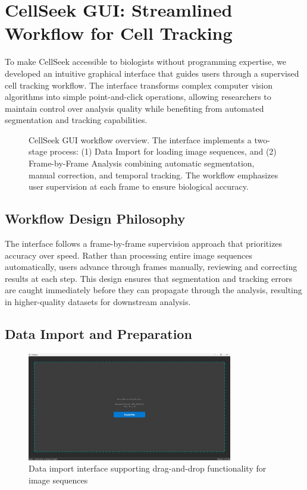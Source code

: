 \documentclass[../cellseek_paper.tex]{subfiles}
\begin{document}
\section{CellSeek GUI: Streamlined Workflow for Cell Tracking}

To make CellSeek accessible to biologists without programming expertise, we developed an intuitive graphical interface that guides users through a supervised cell tracking workflow. The interface transforms complex computer vision algorithms into simple point-and-click operations, allowing researchers to maintain control over analysis quality while benefiting from automated segmentation and tracking capabilities.

\begin{figure}[H]
  \centering
  
  \caption{CellSeek GUI workflow overview. The interface implements a two-stage process: (1) Data Import for loading image sequences, and (2) Frame-by-Frame Analysis combining automatic segmentation, manual correction, and temporal tracking. The workflow emphasizes user supervision at each frame to ensure biological accuracy.}
  \label{fig:gui_workflow}
\end{figure}

\subsection{Workflow Design Philosophy}

The interface follows a frame-by-frame supervision approach that prioritizes accuracy over speed. Rather than processing entire image sequences automatically, users advance through frames manually, reviewing and correcting results at each step. This design ensures that segmentation and tracking errors are caught immediately before they can propagate through the analysis, resulting in higher-quality datasets for downstream analysis.

\subsection{Data Import and Preparation}

\begin{figure}[H]
  \centering
  \includegraphics[width=0.8\textwidth]{images/import_images.jpg}
  \caption{Data import interface supporting drag-and-drop functionality for image sequences}
  \label{fig:import_images}
\end{figure}
\end{document}
